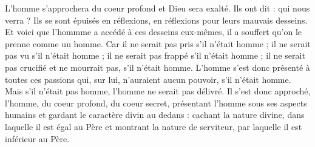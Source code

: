  L'homme s'approchera du coeur profond et Dieu sera exalté. Ils ont dit : qui nous verra ? Ils se sont épuisés en réflexions, en réflexions pour leurs mauvais desseins. Et voici que l'hommme a accédé à ces desseins eux-mêmes, il a souffert qu'on le prenne comme un homme. Car il ne serait pas pris s'il n'était homme ; il ne serait pas vu s'il n'était homme ; il ne serait pas frappé s'il n'était homme ; il ne serait pas crucifié et ne mourrait pas, s'il n'était homme. L'homme s'est donc présenté à toutes ces passions qui, sur lui, n'auraient aucun pouvoir, s'il n'était homme. Mais s'il n'était pas homme, l'homme ne serait pas délivré. Il s'est donc approché, l'homme, du coeur profond, du coeur secret, présentant l'homme sous ses aspects humains et gardant le caractère divin au dedans : cachant la nature divine, dans laquelle il est égal au Père et montrant la nature de serviteur, par laquelle il est inférieur au Père.